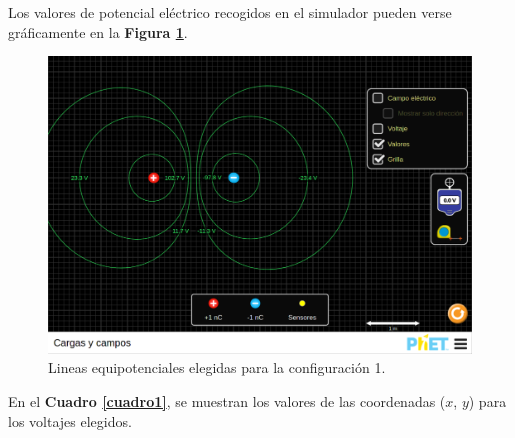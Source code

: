 \documentclass[letter,11pt]{article}
\begin{document}
Los valores de potencial eléctrico recogidos en el simulador pueden verse
gráficamente en la \textbf{Figura \ref{figura3}}.

\begin{figure}[!h]
\centering
\includegraphics[scale=0.34]{resources/figura03.eps}
\caption{Lineas equipotenciales elegidas para la configuración 1.}
\label{figura3}
\end{figure}

En el \textbf{Cuadro \ref{cuadro1}}, se muestran los valores de las coordenadas
($x$, $y$) para los voltajes elegidos.
\end{document}
